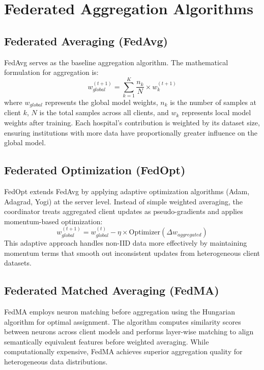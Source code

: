 \documentclass[conference]{IEEEtran}
\begin{document}
\section{Federated Aggregation Algorithms}

\subsection{Federated Averaging (FedAvg)}
FedAvg serves as the baseline aggregation algorithm. The mathematical formulation for aggregation is:
%
\begin{equation}
w_{global}^{(t+1)} = \sum_{k=1}^{K} \frac{n_k}{N} \times w_k^{(t+1)}
\end{equation}
%
where $w_{global}$ represents the global model weights, $n_k$ is the number of samples at client $k$, $N$ is the total samples across all clients, and $w_k$ represents local model weights after training. Each hospital's contribution is weighted by its dataset size, ensuring institutions with more data have proportionally greater influence on the global model.

\subsection{Federated Optimization (FedOpt)}
FedOpt extends FedAvg by applying adaptive optimization algorithms (Adam, Adagrad, Yogi) at the server level. Instead of simple weighted averaging, the coordinator treats aggregated client updates as pseudo-gradients and applies momentum-based optimization:
%
\begin{equation}
w_{global}^{(t+1)} = w_{global}^{(t)} - \eta \times \text{Optimizer}(\Delta w_{aggregated})
\end{equation}
%
This adaptive approach handles non-IID data more effectively by maintaining momentum terms that smooth out inconsistent updates from heterogeneous client datasets.

\subsection{Federated Matched Averaging (FedMA)}
FedMA employs neuron matching before aggregation using the Hungarian algorithm for optimal assignment. The algorithm computes similarity scores between neurons across client models and performs layer-wise matching to align semantically equivalent features before weighted averaging. While computationally expensive, FedMA achieves superior aggregation quality for heterogeneous data distributions.
\end{document}
